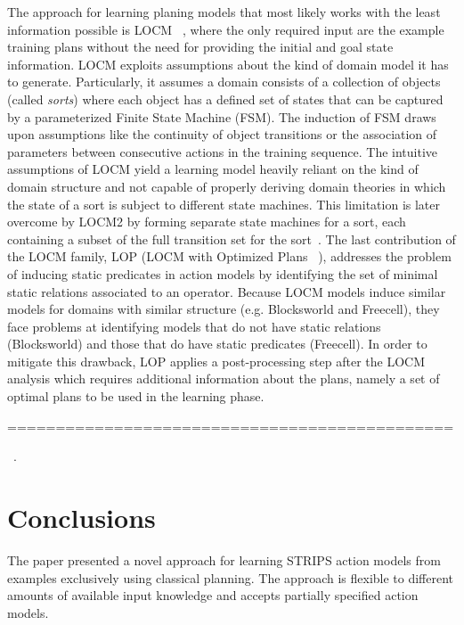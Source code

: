 \documentclass[letterpaper]{article} %
\begin{document}
The approach for learning planing models that most likely works with the least information possible is {\sf LOCM} ~\cite{cresswell2013acquiring}, where the only required input are the example training plans without the need for providing the initial and goal state information. {\sf LOCM} exploits assumptions about the kind of domain model it has to generate. Particularly, it assumes a domain consists of a collection of objects (called \emph{sorts}) where each object has a defined set of states that can be captured by a parameterized Finite State Machine (FSM). The induction of FSM draws upon assumptions like the continuity of object transitions or the association of parameters between consecutive actions in the training sequence. The intuitive assumptions of {\sf LOCM} yield a learning model heavily reliant on the kind of domain structure and not capable of properly deriving domain theories in which the state of a sort is subject to different state machines. This limitation is later overcome by {\sf LOCM2} by forming separate state machines for a sort, each containing a subset of the full transition set for the sort~\cite{cresswell2011generalised}. The last contribution of the {\sf LOCM} family, {\sf LOP} ({\sf LOCM} with Optimized Plans ~\cite{GregoryC16}), addresses the problem of inducing static predicates in action models by identifying the set of minimal static relations associated to an operator. Because {\sf LOCM} models induce similar models for domains with similar structure (e.g. Blocksworld and Freecell), they face problems at identifying models that do not have static relations (Blocksworld) and those that do have static predicates (Freecell). In order to mitigate this drawback, {\sf LOP} applies a post-processing step after the {\sf LOCM} analysis which requires additional information about the plans, namely a set of optimal plans to be used in the learning phase.




==============================================








~\cite{stern2017efficient}.


\section{Conclusions}
The paper presented a novel approach for learning STRIPS action models from examples exclusively using classical planning. The approach is flexible to different amounts of available input knowledge and accepts partially specified action models.
\end{document}
